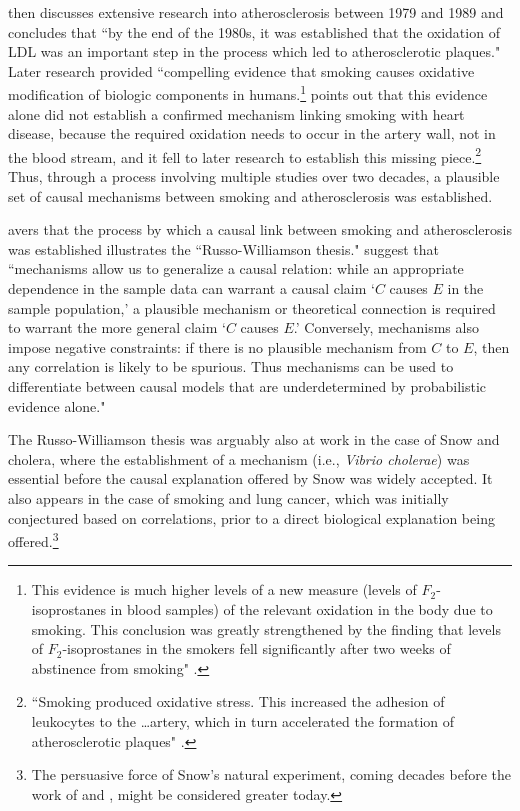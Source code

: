 \documentclass[12pt,reqno,titlepage]{amsart}
\theoremstyle{definition}
\begin{document}
\begin{doublespace}
\citet{Gillies2011-GILTRT-3} then discusses extensive research into atherosclerosis between 1979 and 1989 and concludes that ``by the end of the 1980s, it was established that the oxidation of LDL was an important step in the process which led to atherosclerotic plaques."
Later research provided ``compelling evidence that smoking causes oxidative modification of biologic components in humans.\footnote{This evidence is much higher levels of a new measure (levels of $F_2$-isoprostanes in blood samples) of the relevant oxidation in the body due to smoking.
This conclusion was greatly strengthened by the finding that levels of $F_2$-isoprostanes in the smokers fell significantly after two weeks of abstinence from smoking" \citep[pp.\,1201--2]{Morrow:1995gz}.}
\citet[p.\,120]{Gillies2011-GILTRT-3} points out that this evidence alone did not establish a confirmed mechanism linking smoking with heart disease, because the required oxidation needs to occur in the artery wall, not in the blood stream, and it fell to later research to establish this missing piece.\footnote{
``Smoking produced oxidative stress. 
This increased the adhesion of leukocytes to the \dots artery, which in turn accelerated the formation of atherosclerotic plaques" \citep[p.\,123]{Gillies2011-GILTRT-3}.}
Thus, through a process involving multiple studies over two decades, a plausible set of causal mechanisms between smoking and atherosclerosis was established. 

\citet{Gillies2011-GILTRT-3} avers that the process by which a causal link between smoking and atherosclerosis was established illustrates the ``Russo-Williamson thesis."
 \citet[p.\,159]{Russo:2007iz} suggest that ``mechanisms allow us to generalize a causal relation: while an appropriate dependence in the sample data can warrant a causal claim `$C$ causes $E$ in the sample population,' a plausible mechanism or theoretical connection is required to warrant the more general claim `$C$ causes $E$.' 
Conversely, mechanisms also impose negative constraints: if there is no plausible mechanism from $C$ to $E$, then any correlation is likely to be spurious.
Thus mechanisms can be used to differentiate between causal models that are underdetermined by probabilistic evidence alone."

The Russo-Williamson thesis was arguably also at work in the case of Snow and cholera, where the establishment of a mechanism (i.e., \emph{Vibrio cholerae}) was essential before the causal explanation offered by Snow was widely accepted.
It also appears in the case of smoking and lung cancer, which was initially conjectured based on correlations, prior to a direct biological explanation being offered.\footnote{
The persuasive force of Snow's natural experiment, coming decades before the work of \citet{Neyman:1923aa} and \citet{Fisher:1935aa}, might be considered greater today.}


\end{doublespace}
\end{document}
